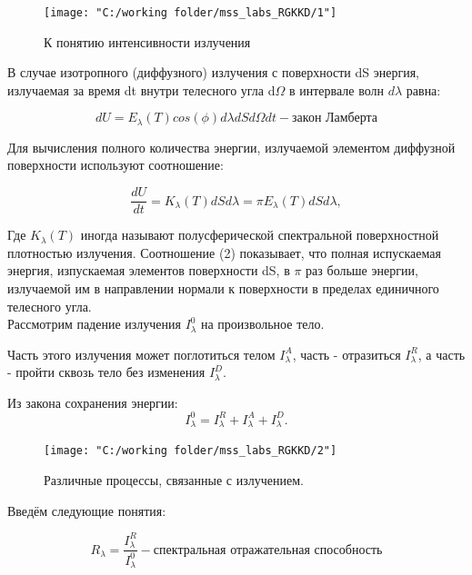 \documentclass[12pt,a4paper]{article}
\begin{document}
	\begin{figure}[H]
		\centering
		\texttt{[image: "C:/working folder/mss\_labs\_RGKKD/1"]}
		\caption{К понятию интенсивности излучения}
		\label{fig:1}
	\end{figure}

	В случае изотропного (диффузного) излучения с поверхности dS энергия, излучаемая за время dt внутри телесного угла d$\Omega$ в интервале волн $d\lambda$ равна:
	
	\begin{equation}
		dU = E_\lambda(T)cos(\phi)d\lambda dS d\Omega dt - \text{закон Ламберта}
	\end{equation}
	
	Для вычисления полного количества энергии, излучаемой элементом диффузной поверхности используют соотношение: 
	
	\begin{equation}
		\frac{dU}{dt} = K_\lambda(T)dSd\lambda = \pi E_\lambda(T)dS d\lambda,
	\end{equation}

	Где $ K_\lambda(T)$ иногда называют полусферической спектральной поверхностной плотностью излучения. Соотношение (2) показывает, что полная испускаемая энергия, изпускаемая элементов поверхности dS, в $\pi$ раз больше энергии, излучаемой им в направлении нормали к поверхности в пределах единичного телесного угла.\\
	
	Рассмотрим падение излучения  $I_\lambda^0$ на произвольное тело.
	
	Часть этого излучения может поглотиться телом $I_\lambda^A$, часть - отразиться $I_\lambda^R$, а часть - пройти сквозь тело без изменения $I_\lambda^D$.
	
	Из закона сохранения энергии:
	\begin{equation}
		I_\lambda^0 = I_\lambda^R + I_\lambda^A + I_\lambda^D.
	\end{equation}


	\begin{figure}[H]
		\centering
		\texttt{[image: "C:/working folder/mss\_labs\_RGKKD/2"]}
		\caption{Различные процессы, связанные с излучением.}
		\label{fig:2}
	\end{figure}

	Введём следующие понятия:
	
	\begin{equation}
		R_\lambda = \frac{I_\lambda^R}{I_\lambda^0}  - \text{спектральная отражательная способность} 
	\end{equation}
	
\end{document}

